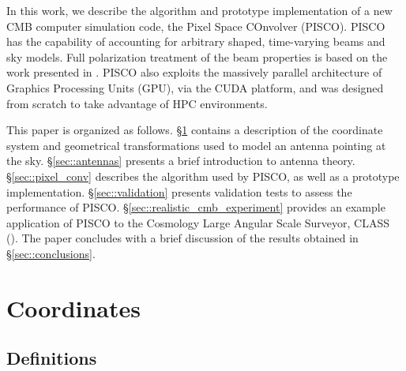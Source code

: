 \documentclass[a4paper,11pt]{article}
\begin{document}

In this work, we describe the algorithm and prototype implementation of a new CMB computer simulation code, the Pixel Space COnvolver (PISCO). PISCO has the capability of accounting for arbitrary shaped, time-varying beams and sky models. Full polarization treatment of the beam properties is based on the work presented in \cite{2007MNRAS.376.1767O}. PISCO also exploits the massively parallel architecture of Graphics Processing Units (GPU), via the CUDA platform, and was designed from scratch to take advantage of HPC environments.

This paper is organized as follows. 
\S\ref{sec::coordinate-systems} contains a description of the coordinate system and geometrical transformations used to model an antenna pointing at the sky.
\S\ref{sec::antennas} presents a brief introduction to antenna theory. 
\S\ref{sec::pixel_conv} describes the algorithm used by PISCO, as well as a prototype implementation. 
\S\ref{sec::validation} presents validation tests to assess the performance of PISCO. 
\S\ref{sec::realistic_cmb_experiment} provides an example application of PISCO to the Cosmology Large Angular Scale Surveyor, CLASS (\cite{2016SPIE.9914E..1KH}). 
The paper concludes with a brief discussion of the results obtained in \S\ref{sec::conclusions}.

%
\section{Coordinates}
\label{sec::coordinate-systems}

\subsection{Definitions}
\end{document}
